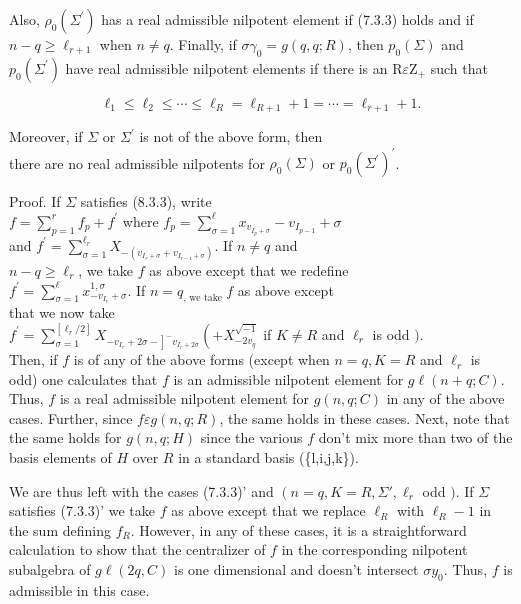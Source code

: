 \documentclass[10pt]{article}
\begin{document}
Also, $\rho_{0}\left(\Sigma^{\prime}\right)$ has a real admissible nilpotent element if (7.3.3) holds and if $n-q \geq \ell_{r+1}$ when $n \neq q$. Finally, if $\sigma \gamma_{0}=g(q, q ; R)$, then $p_{0}(\Sigma)$ and $p_{0}\left(\Sigma^{\prime}\right)$ have real admissible nilpotent elements if there is an $\mathrm{R} \varepsilon \mathrm{Z}_{+}$ such that


\begin{equation*}
\ell_{1} \leq \ell_{2} \leq \cdots \leq \ell_{R}=\ell_{R+1}+1=\cdots=\ell_{r+1}+1 . \tag{7.3.3}
\end{equation*}


Moreover, if $\Sigma$ or $\Sigma^{\prime}$ is not of the above form, then\\
there are no real admissible nilpotents for $\rho_{0}(\Sigma)$ or $p_{0}{\left(\Sigma^{\prime}\right)}^{\prime}$.

Proof. If $\Sigma$ satisfies (8.3.3), write\\
$f=\sum_{p=1}^{r} f_{p}+f^{\prime}$ where $f_{p}=\sum_{\sigma=1}^{\ell} x_{v_{I_{p}+\sigma}}-v_{I_{p-1}}+\sigma$\\
and $f^{\prime}=\sum_{\sigma=1}^{\ell_{r}} X_{-\left(v_{I_{r}+\sigma}+v_{I_{r-1}+\sigma}\right)}$. If $n \neq q$ and\\
$n-q \geq \ell_{r}$, we take $f$ as above except that we redefine\\
$f^{\prime}=\sum_{\sigma=1}^{\ell} x_{-v_{I_{r}}+\sigma}^{1, \sigma}$. If $n=q_{\text {, we take }} f$ as above except\\
that we now take\\
$f^{\prime}=\sum_{\sigma=1}^{\left[\ell_{r} / 2\right]} X_{\left.-v_{I_{r}}+2 \sigma-\right]^{-} v_{I_{r}+2 \sigma}}\left(+X_{-2 v_{q}}^{\sqrt{-1}}\right.$ if $K \neq R$ and $\ell_{r}$ is odd $)$.\\
Then, if $f$ is of any of the above forms (except when $n=q, K=R$ and $\ell_{r}$ is odd) one calculates that $f$ is an admissible nilpotent element for $g \ell(n+q ; C)$. Thus, $f$ is a real admissible nilpotent element for $g(n, q ; C)$ in any of the above cases. Further, since $f \varepsilon g(n, q ; R)$, the same holds in these cases. Next, note that the same holds for $g(n, q ; H)$ since the various $f$ don't mix more than two of the basis elements of $H$ over $R$ in a standard basis (\{l,i,j,k\}).

We are thus left with the cases (7.3.3)' and $\left(n=q, K=R, \Sigma \prime, \ell_{r}\right.$ odd $)$. If $\Sigma$ satisfies (7.3.3)' we take $f$ as above except that we replace $\ell_{R}$ with $\ell_{R}-1$ in the sum defining $f_{R}$. However, in any of these cases, it is a straightforward calculation to show that the centralizer of $f$ in the corresponding nilpotent subalgebra of $g \ell(2 q, C)$ is one dimensional and doesn't intersect $\sigma y_{0}$. Thus, $f$ is admissible in this case.
\end{document}
